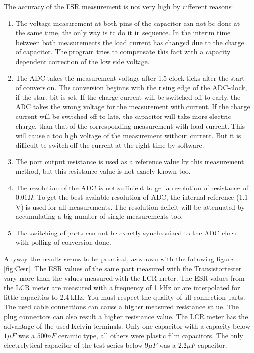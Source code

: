 The accuracy of the ESR measurement is not very high by different reasons:
\begin{enumerate}
\item The voltage measurement at both pins of the capacitor can not be done at the same time, the only way is to do it in sequence.
In the interim time between both measurements the load current has changed due to the charge of capacitor.
The program tries to compensate this fact with a capacity dependent correction of the low side voltage.
\item The ADC takes the measurement voltage after 1.5 clock ticks after the start of conversion.
The conversion beginns with the rising edge of the ADC-clock, if the start bit is set.
If the charge current will be switched off to early, the ADC takes the wrong voltage for the measurement with current.
If the charge current will be switched off to late, the capacitor will take more electric charge, than that of the
corresponding measurement with load current. This will cause a too high voltage of the measurement without current.
But it is difficult to switch off the current at the right time by software. 
\item The port output resistance is used as a reference value by this measurement method, but this resistance value is
not exacly known too.
\item The resolution of the ADC is not sufficient to get a resolution of resistance of \(0.01 \Omega\).
To get the best avaiable resolution of ADC, the internal reference (1.1 V) is used for all measurements.
The resolution deficit will be attenuated by accumulating a big number of single measurements too.
\item The switching of ports can not be exactly synchronized to the ADC clock with polling of conversion done.
\end{enumerate}

Anyway the results seems to be practical, as shown with the following figure \ref{fig:Cesr}.
The ESR values of the same part measured with the Transistortester vary more than the values measured with the LCR meter.
The ESR values from the LCR meter are measured with a frequency of 1 kHz or are interpolated for little capacities to
2.4 kHz.
You must respect the quality of all connection parts. The used cable connections can cause a higher measured resistance value.
The plug connectors can also result a higher resistance value.
The LCR meter has the advantage of the used Kelvin terminals.
Only one capacitor with a capacity below \(1 \mu F\) was a \(500 nF\) ceramic type, all others were
plastic film capacitors.
The only electrolytical capacitor of the test series below \(9 \mu F\) was a \(2.2 \mu F\) capacitor.

